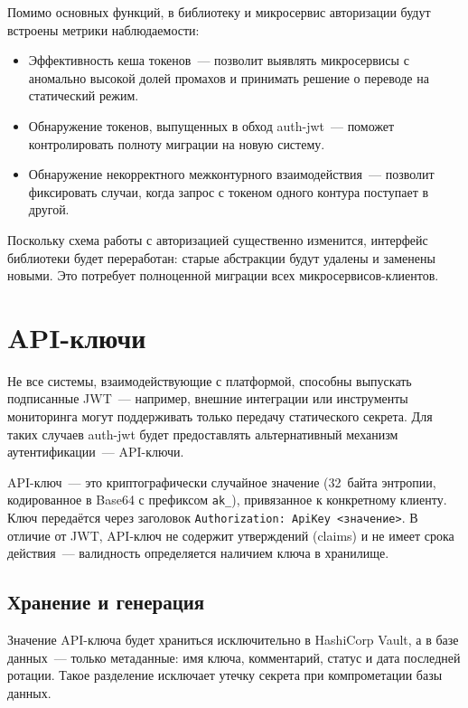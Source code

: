 Помимо основных функций, в библиотеку и микросервис авторизации
будут встроены метрики наблюдаемости:
\begin{itemize}
  \item Эффективность кеша токенов~--- позволит выявлять микросервисы
    с аномально высокой долей промахов
    и принимать решение о переводе на статический режим.
  \item Обнаружение токенов, выпущенных в обход auth-jwt~---
    поможет контролировать полноту миграции на новую систему.
  \item Обнаружение некорректного межконтурного взаимодействия~---
    позволит фиксировать случаи,
    когда запрос с токеном одного контура поступает в другой.
\end{itemize}

Поскольку схема работы с авторизацией существенно изменится,
интерфейс библиотеки будет переработан:
старые абстракции будут удалены и заменены новыми.
Это потребует полноценной миграции всех микросервисов-клиентов.

\section{API-ключи}\label{sec:api-keys}

Не все системы, взаимодействующие с платформой,
способны выпускать подписанные JWT~---
например, внешние интеграции или инструменты мониторинга
могут поддерживать только передачу статического секрета.
Для таких случаев auth-jwt будет предоставлять
альтернативный механизм аутентификации~--- API-ключи.

API-ключ~--- это криптографически случайное значение (32~байта энтропии,
кодированное в Base64 с префиксом \texttt{ak\_}),
привязанное к конкретному клиенту.
Ключ передаётся через заголовок
\texttt{Authorization: ApiKey <значение>}.
В отличие от JWT, API-ключ не содержит утверждений (claims)
и не имеет срока действия~---
валидность определяется наличием ключа в хранилище.

\subsection{Хранение и генерация}\label{subsec:api-key-storage}

Значение API-ключа будет храниться исключительно в HashiCorp Vault,
а в базе данных~--- только метаданные:
имя ключа, комментарий, статус и дата последней ротации.
Такое разделение исключает утечку секрета при компрометации базы данных.

